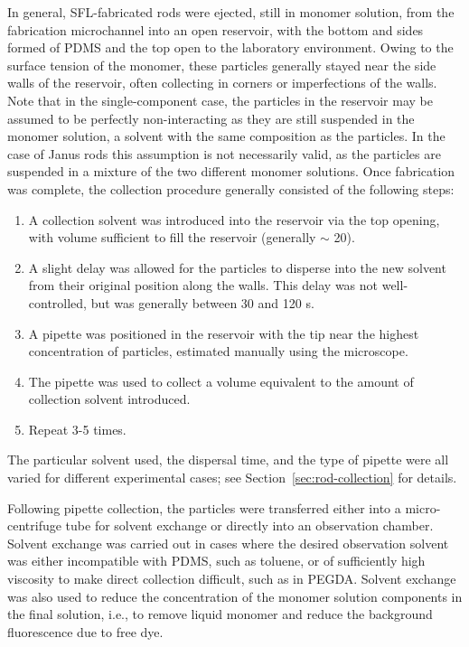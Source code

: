 In general, SFL-fabricated rods were ejected, still in monomer solution, from the fabrication microchannel into 
an open reservoir, with the bottom and sides formed of PDMS and the top open to the 
laboratory environment.  Owing to the
surface tension of the monomer, these particles generally stayed near the side walls of the reservoir, often
collecting in corners or imperfections of the walls.  Note that in the single-component case, the particles in
the reservoir may be assumed to be perfectly non-interacting as they are still suspended in the monomer solution, 
a solvent with the
same composition as the particles.   In the case of Janus rods this assumption is not necessarily valid, as
the particles are suspended in a mixture of the two different monomer solutions.  Once fabrication 
was complete, the collection procedure generally consisted of the following steps:

\begin{enumerate}
\item A collection solvent was introduced into the reservoir via the top opening, with volume sufficient to
fill the reservoir (generally $\sim$ 20\uL).
\item A slight delay was allowed for the particles to disperse into the new solvent from their 
original position along the 
walls. This delay was not well-controlled, but was generally between 30 and 120 s.
\item A pipette was positioned in the reservoir with the tip near the highest concentration of particles, estimated
manually using the microscope.
\item The pipette was used to collect a volume equivalent to the amount of collection solvent introduced.
\item Repeat 3-5 times.
\end{enumerate}

The particular solvent used, the dispersal time, and the type of pipette were all varied for different experimental
cases; see Section~\ref{sec:rod-collection} for details.

Following pipette collection, the particles were transferred either  into a micro-centrifuge tube for solvent 
exchange or directly into an observation chamber.  Solvent exchange was carried out in cases where the desired
observation solvent was either incompatible with PDMS, such as toluene, or of sufficiently high viscosity to make
direct collection difficult, such as in PEGDA.  Solvent exchange was also used to reduce
the concentration of the monomer solution components in the final solution, i.e., to remove liquid monomer and 
reduce the background fluorescence due to free dye.

